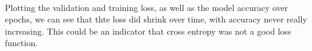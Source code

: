 \documentclass[11pt]{article}
\begin{document}
    \begin{center}
    \end{center}
    { \hspace*{\fill} \\}
    
    Plotting the validation and training loss, as well as the model accuracy
over epochs, we can see that thte loss did shrink over time, with
accuracy never really increasing. This could be an indicator that cross
entropy was not a good loss function.


    
    
    
\end{document}
